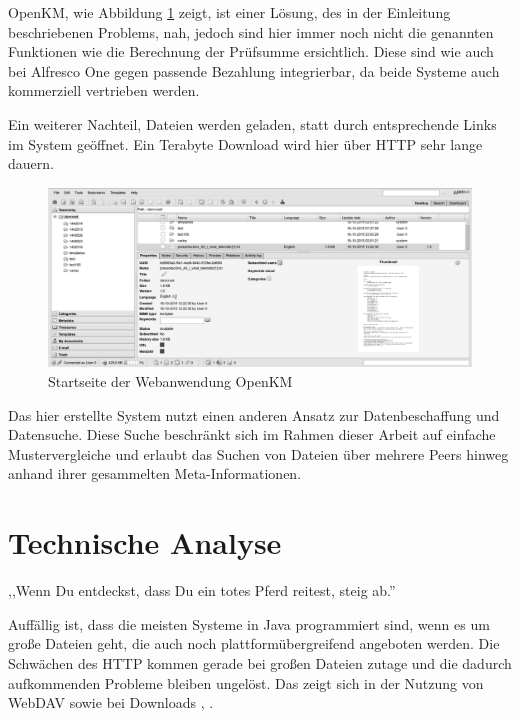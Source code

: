 \documentclass[oneside, ngerman, toc=bibliography,bibliography=totoc,listof=entryprefix, open=right,numbers=noenddot,fontsize=12pt]{scrbook}
\newcommand\chapmd[2]{\begin{mdframed}[%
		rightline=false,leftline=false,topline=false,bottomline=false,frametitlerule=false,
		userdefinedwidth=\textwidth,frametitlealignment=\flushright, %
		frametitlerulecolor=black,frametitle={\small #1}]
		\flushright{} \footnotesize{} #2
	\end{mdframed}}
\begin{document}
{OpenKM}, wie Abbildung \ref{openkm:home} zeigt, ist einer Lösung, des in der Einleitung beschriebenen Problems, nah, jedoch sind hier immer noch nicht die genannten Funktionen wie die Berechnung der Prüfsumme ersichtlich. Diese sind wie auch bei  {Alfresco One} gegen passende Bezahlung integrierbar, da beide Systeme auch kommerziell vertrieben werden.

Ein weiterer Nachteil, Dateien werden geladen, statt durch entsprechende Links im System geöffnet. Ein Terabyte Download wird hier über HTTP sehr lange dauern. 

\begin{figure}[htbp] 
    \centering
    \includegraphics[width=\textwidth]{Masterarbeit_Bilder/openkm.png}
    \caption{Startseite der Webanwendung OpenKM}
    \label{openkm:home}
\end{figure}  


Das hier erstellte System nutzt einen anderen Ansatz zur Datenbeschaffung und Datensuche. Diese Suche beschränkt sich im Rahmen dieser Arbeit auf einfache Mustervergleiche und erlaubt das Suchen von Dateien über mehrere Peers hinweg anhand ihrer gesammelten Meta-Informationen. 




\chapter{Technische Analyse}
\label{chap:techAnal}
\chapmd{ Eine Weisheit der Dakota-Indianer}{,,Wenn Du entdeckst, dass Du ein totes Pferd reitest, steig ab.''}
 
Auffällig ist, dass die meisten Systeme in Java programmiert sind, wenn es um große Dateien geht, die auch noch plattformübergreifend angeboten werden. Die Schwächen des HTTP kommen gerade bei großen Dateien zutage und die dadurch aufkommenden Probleme bleiben ungelöst. Das zeigt sich in der Nutzung von WebDAV sowie bei Downloads \cite{davlimit}, \cite{httplimit}.
\end{document}
